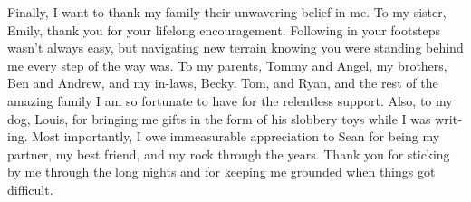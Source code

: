 \documentclass{msuphddissertation_ssn}
\begin{document}
\begin{otherlanguage}{english}
\begin{acknowledgment}
Finally, I want to thank my family their unwavering belief in me. To my sister, Emily, thank you for your lifelong encouragement. Following in your footsteps wasn't always easy, but navigating new terrain knowing you were standing behind me every step of the way was. To my parents, Tommy and Angel, my brothers, Ben and Andrew, and my in-laws, Becky, Tom, and Ryan, and the rest of the amazing family I am so fortunate to have for the relentless support. Also, to my dog, Louis, for bringing me gifts in the form of his slobbery toys while I was writing. Most importantly, I owe immeasurable appreciation to Sean for being my partner, my best friend, and my rock through the years. Thank you for sticking by me through the long nights and for keeping me grounded when things got difficult.

\end{acknowledgment}


\TOC %





\newpage

\end{otherlanguage}
\end{document}

